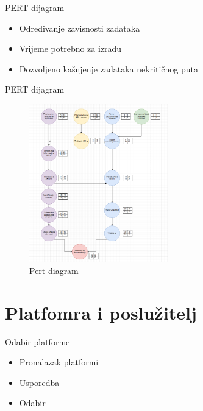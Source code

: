 \documentclass[aspectratio=169,xcolor=dvipsnames]{beamer}
\begin{document}

\begin{frame}{PERT dijagram}
    \begin{itemize}
        \item Određivanje zavisnosti zadataka 
        \item Vrijeme potrebno za izradu
        \item Dozvoljeno kašnjenje zadataka nekritičnog puta
    \end{itemize}
    
\end{frame}

\begin{frame}{PERT dijagram}
    \begin{figure}
        \centering
        \includegraphics[width=6cm]{pert}
        \caption{Pert diagram}
        \label{fig:pert}
    \end{figure}
\end{frame}

\section{Platfomra i poslužitelj}

\begin{frame}{Odabir platforme}
    \begin{itemize}
        \item Pronalazak platformi 
        \item Usporedba 
        \item Odabir
    \end{itemize}
\end{frame}

\end{document}
